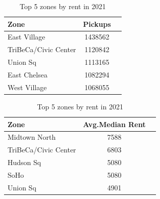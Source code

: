\documentclass[11pt]{article}
\begin{document}
\begin{table}[!htb]
\begin{minipage}{.5\linewidth}
    \centering
    \medskip

\caption{Top 5 zones by pickups in 2021} \label{tab:first_table}
\begin{tabular}{|l |c|c| } 
  \hline
    Zone & Pickups \\
    \hline
    East Village & 1438562 \\
    TriBeCa/Civic Center & 1120842 \\
    Union Sq & 1113165 \\
    East Chelsea & 1082294 \\
    West Village & 1068055 \\
  \hline

\end{tabular}
\end{minipage}\hfill
\begin{minipage}{.5\linewidth}
    \centering
    \medskip

\caption{Top 5 zones by rent in 2021}\label{tab:second_table}
\begin{tabular}{|l |c|c| } 
  \hline
    Zone & Avg.Median Rent \\
    \hline
    Midtown North &	7588 \\
    TriBeCa/Civic Center & 6803 \\
    Hudson Sq &	5080 \\
    SoHo &	5080 \\
    Union Sq &	4901 \\
  \hline
\end{tabular}
\end{minipage}
\end{table}
\end{document}
